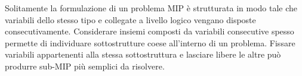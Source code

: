 Solitamente la formulazione di un problema MIP è strutturata in modo tale che
variabili dello stesso tipo e collegate a livello logico vengano disposte
consecutivamente.
Considerare insiemi composti da variabili consecutive spesso permette di
individuare sottostrutture coese all'interno di un problema.
Fissare variabili appartenenti alla stessa sottostruttura e lasciare libere
le altre può produrre sub-MIP più semplici da risolvere.

